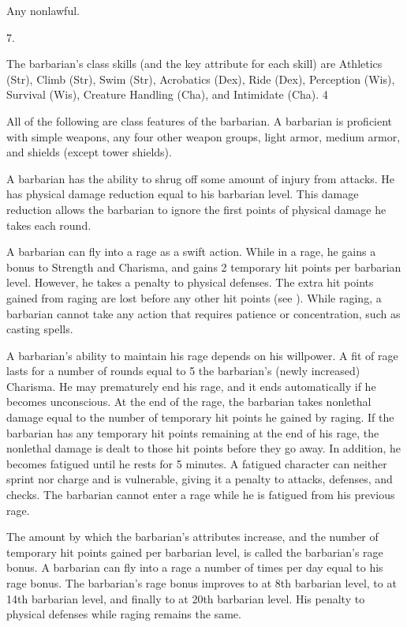  Any nonlawful.

 7.

The barbarian's class skills (and the key attribute for each skill) are
Athletics (Str), Climb (Str), Swim (Str), Acrobatics (Dex), Ride (Dex), Perception (Wis), Survival (Wis), Creature Handling (Cha), and Intimidate (Cha).
 4


All of the following are class features of the barbarian.
  A barbarian is proficient with simple weapons, any four other weapon groups, light armor, medium armor, and shields (except tower shields).

 A barbarian has the ability to shrug off some amount of injury from attacks. He has physical damage reduction equal to his barbarian level. This damage reduction allows the barbarian to ignore the first points of physical damage he takes each round.

 A barbarian can fly into a rage as a swift action. While in a rage, he gains a  bonus to Strength and Charisma, and gains 2 temporary hit points per barbarian level. However, he takes a  penalty to physical defenses. The extra hit points gained from raging are lost before any other hit points (see ). While raging, a barbarian cannot take any action that requires patience or concentration, such as casting spells.

A barbarian's ability to maintain his rage depends on his willpower. A fit of rage lasts for a number of rounds equal to 5 \add the barbarian's (newly increased) Charisma. He may prematurely end his rage, and it ends automatically if he becomes unconscious. At the end of the rage, the barbarian takes nonlethal damage equal to the number of temporary hit points he gained by raging. If the barbarian has any temporary hit points remaining at the end of his rage, the nonlethal damage is dealt to those hit points before they go away. In addition, he becomes fatigued until he rests for 5 minutes. A fatigued character can neither sprint nor charge and is vulnerable, giving it a  penalty to attacks, defenses, and checks. The barbarian cannot enter a rage while he is fatigued from his previous rage.

The amount by which the barbarian's attributes increase, and the number of temporary hit points gained per barbarian level, is called the barbarian's rage bonus. A barbarian can fly into a rage a number of times per day equal to his rage bonus. The barbarian's rage bonus improves to  at 8th barbarian level, to  at 14th barbarian level, and finally to  at 20th barbarian level. His penalty to physical defenses while raging remains the same.

